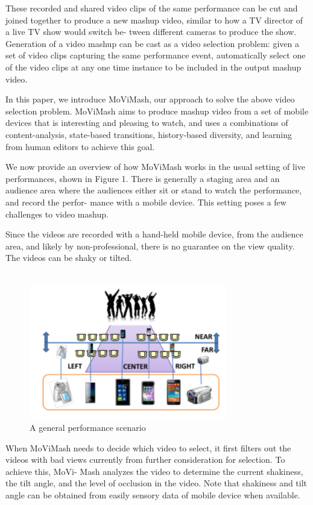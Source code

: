 \documentclass[conference]{IEEEtran}
\begin{document}
These recorded and shared video clips of the same performance
can be cut and joined together to produce a new mashup video,
similar to how a TV director of a live TV show would switch be-
tween different cameras to produce the show. Generation of a video
mashup can be cast as a video selection problem: given a set of
video clips capturing the same performance event, automatically
select one of the video clips at any one time instance to be included
in the output mashup video.

In this paper, we introduce MoViMash, our approach to solve
the above video selection problem. MoViMash aims to produce
mashup video from a set of mobile devices that is interesting and
pleasing to watch, and uses a combinations of content-analysis,
state-based transitions, history-based diversity, and learning from
human editors to achieve this goal.

We now provide an overview of how MoViMash works in the
usual setting of live performances, shown in Figure 1. There is
generally a staging area and an audience area where the audiences
either sit or stand to watch the performance, and record the perfor-
mance with a mobile device. This setting poses a few challenges to
video mashup.

Since the videos are recorded with a hand-held mobile device,
from the audience area, and likely by non-professional, there is no
guarantee on the view quality. The videos can be shaky or tilted. \\\\
\begin{figure}
    \centering
    \includegraphics{img1.png}
    \caption{A general performance scenario}
    \label{fig:my_label}
\end{figure}
 When MoViMash needs to decide which
video to select, it first filters out the videos with bad views currently
from further consideration for selection. To achieve this, MoVi-
Mash analyzes the video to determine the current shakiness, the tilt
angle, and the level of occlusion in the video. Note that shakiness and tilt angle can be obtained from easily sensory data of mobile
device when available.
\end{document}
